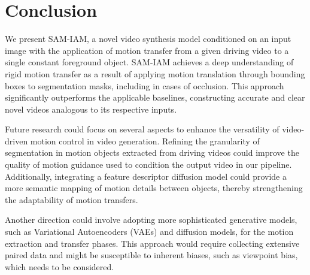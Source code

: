 \section{Conclusion}

We present SAM-IAM, a novel video synthesis model conditioned on an input image with the application of motion transfer from a given driving video to a single constant foreground object. SAM-IAM achieves a deep understanding of rigid motion transfer as a result of applying motion translation through bounding boxes to segmentation masks, including in cases of occlusion. This approach significantly outperforms the applicable baselines, constructing accurate and clear novel videos analogous to its respective inputs. 

Future research could focus on several aspects to enhance the versatility of video-driven motion control in video generation. Refining the granularity of segmentation in motion objects extracted from driving videos could improve the quality of motion guidance used to condition the output video in our pipeline. Additionally, integrating a feature descriptor diffusion model \cite{Dutt_2024_CVPR, luo2024diffusion} could provide a more semantic mapping of motion details between objects, thereby strengthening the adaptability of motion transfers.

Another direction could involve adopting more sophisticated generative models, such as Variational Autoencoders (VAEs) and diffusion models, for the motion extraction and transfer phases. This approach would require collecting extensive paired data and might be susceptible to inherent biases, such as viewpoint bias, which needs to be considered.
